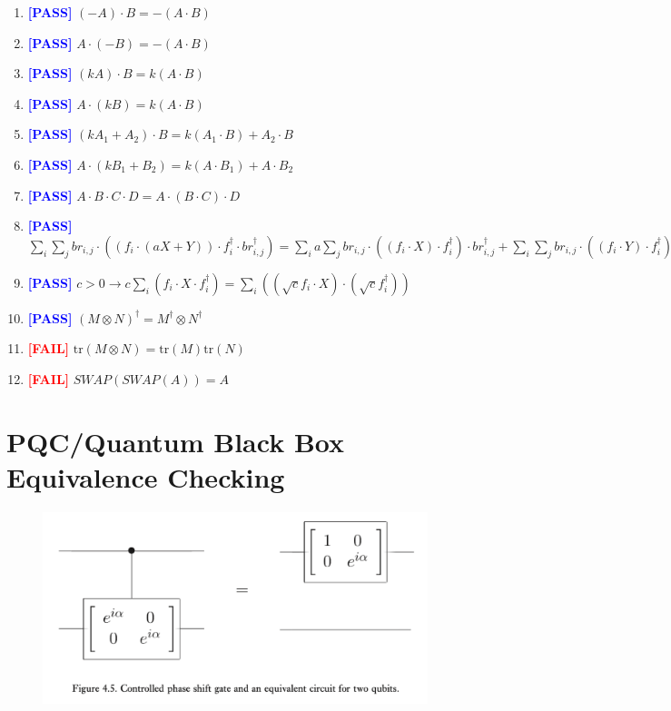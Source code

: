 \documentclass[manuscript, review, timestamp]{acmart}
\newcommand{\tr}{\mathrm{tr}}
\newcommand{\pass}{\textcolor{blue}{\textbf{ [PASS] }}}
\newcommand{\fail}{\textcolor{red}{\textbf{ [FAIL] }}}
\begin{document}
\begin{enumerate}
  \item \pass $(-A) \cdot B = - (A \cdot B)$
  \item \pass $A \cdot (-B) = - (A \cdot B)$
  \item \pass $(k A) \cdot B = k (A \cdot B)$
  \item \pass $A \cdot (k B) = k (A \cdot B)$
  \item \pass $(k A_1 + A_2) \cdot B = k (A_1 \cdot B) + A_2 \cdot B$
  \item \pass $A \cdot (k B_1 + B_2) = k (A \cdot B_1) + A \cdot B_2$
  \item \pass $A \cdot B \cdot C \cdot D = A \cdot (B \cdot C) \cdot D$
  \item \pass $\sum_i \sum_j br_{i, j} \cdot ((f_i \cdot (a X + Y)) \cdot f_i^\dagger \cdot br_{i, j}^\dagger) = \sum_i a \sum_j br_{i, j} \cdot ((f_i \cdot X) \cdot f_i^\dagger) \cdot br_{i, j}^\dagger + \sum_i \sum_j br_{i, j} \cdot ((f_i \cdot Y) \cdot f_i^\dagger) \cdot br_{i, j}^\dagger$
  \item \pass $c > 0 \to c \sum_i (f_i \cdot X \cdot f_i^\dagger) = \sum_i ((\sqrt{c} f_i \cdot X) \cdot (\sqrt{c} f_i^\dagger))$
  \item \pass $(M \otimes N)^\dagger = M^\dagger \otimes N^\dagger$
  \item \fail $\tr (M \otimes N) = \tr(M) \tr(N)$
  \item \fail $SWAP(SWAP(A))=A$
\end{enumerate}

\clearpage
\appendix 

\section{PQC/Quantum Black Box Equivalence Checking}
\begin{figure}[h]
  \includegraphics*[width=\textwidth]{QCQI.Fig4.5.png}
\end{figure}
\end{document}
